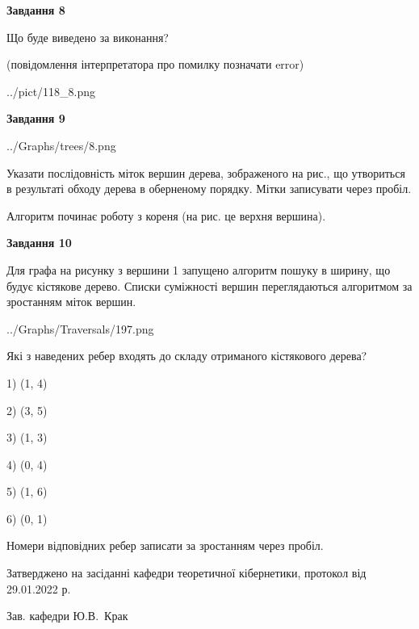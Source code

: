 \documentclass[12pt, ukrainian]{article}
\begin{document}
{\begin {large}
{\begin {center}\textbf{Завдання 8}\end {center}}\par
Що буде виведено за виконання?\par
 (повідомлення інтерпретатора про помилку позначати error)\par
\begin{center}
	{../pict/118_8.png}
\end{center}
\newpage

{\begin {center}\textbf{Завдання 9}\end {center}}\par

\begin{center}
	{../Graphs/trees/8.png}
\end{center}
Указати послідовність міток вершин дерева, зображеного на рис., що утвориться в результаті обходу дерева в оберненому порядку. Мітки записувати через пробіл.\par Алгоритм починає роботу з кореня (на рис. це верхня вершина).\par
\newpage

{\begin {center}\textbf{Завдання 10}\end {center}}\par
Для графа на рисунку з вершини 1 запущено алгоритм пошуку в ширину, що будує кістякове дерево. Списки суміжності вершин переглядаються алгоритмом за зростанням міток вершин.\par
\begin{center}
	{../Graphs/Traversals/197.png}
\end{center}
\par Які з наведених ребер входять до складу отриманого кістякового дерева?\par
1) (1, 4)\par
2) (3, 5)\par
3) (1, 3)\par
4) (0, 4)\par
5) (1, 6)\par
6) (0, 1)\par
{\vskip 15pt} Номери відповідних ребер записати за зростанням через пробіл.\par
\newpage


\end {large}
}
{\smallskip \begin {small} Затверджено на засіданні кафедри теоретичної кібернетики, протокол  від   29.01.2022 р.\par\smallskip\smallskip
{\parbox {6.5 cm}{Зав. кафедри \dotfill Ю.В.~Крак}} \end{small}}
\end{document}
